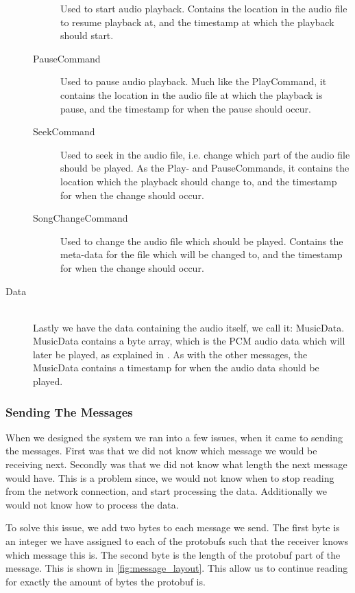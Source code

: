 \begin{description}
\begin{description}
                Used to start audio playback.
                Contains the location in the audio file to resume playback at, and the timestamp at which the playback should start.
            \item[PauseCommand]
                Used to pause audio playback.
                Much like the PlayCommand, it contains the location in the audio file at which the playback is pause, and the timestamp for when the pause should occur.
            \item[SeekCommand]
                Used to seek in the audio file, i.e. change which part of the audio file should be played.
                As the Play- and PauseCommands, it contains the location which the playback should change to, and the timestamp for when the change should occur.
            \item[SongChangeCommand]
                Used to change the audio file which should be played.
                Contains the meta-data for the file which will be changed to, and the timestamp for when the change should occur.
        \end{description}

    \item[Data] \hfill \\
        Lastly we have the data containing the audio itself, we call it: MusicData.
        MusicData contains a byte array, which is the PCM audio data which will later be played, as explained in .
        As with the other messages, the MusicData contains a timestamp for when the audio data should be played.
\end{description}

\subsubsection{Sending The Messages}
When we designed the system we ran into a few issues, when it came to sending the messages.
First was that we did not know which message we would be receiving next.
Secondly was that we did not know what length the next message would have.
This is a problem since, we would not know when to stop reading from the network connection, and start processing the data.
Additionally we would not know how to process the data.

To solve this issue, we add two bytes to each message we send.
The first byte is an integer we have assigned to each of the protobufs such that the receiver knows which message this is.
The second byte is the length of the protobuf part of the message.
This is shown in \cref{fig:message_layout}.
This allow us to continue reading for exactly the amount of bytes the protobuf is.

